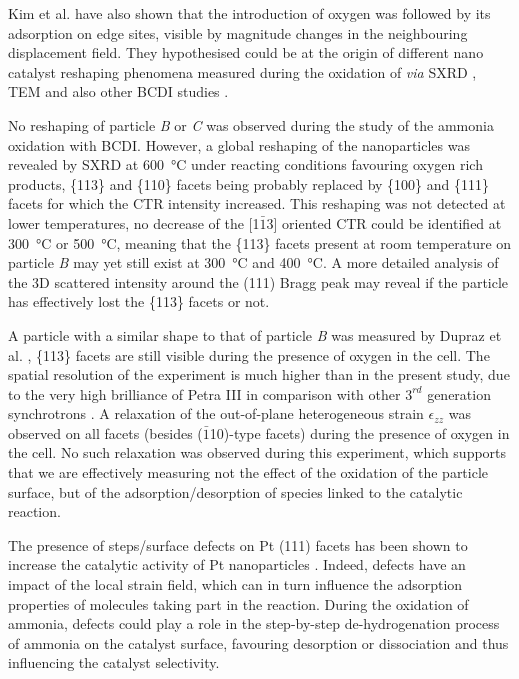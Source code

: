 Kim et al. \parencite*{Kim2018} have also shown that the introduction of oxygen was followed by its adsorption on edge sites, visible by magnitude changes in the neighbouring displacement field.
They hypothesised could be at the origin of different nano catalyst reshaping phenomena measured during the oxidation of  \textit{via} SXRD \parencite{Nolte2008, Hejral2016}, TEM \parencite{Vendelbo2014} and also other BCDI studies \parencite{Abuin2019}.

No reshaping of particle \textit{B} or \textit{C} was observed during the study of the ammonia oxidation with BCDI.
However, a global reshaping of the nanoparticles was revealed by SXRD at \qty{600}{\degreeCelsius} under reacting conditions favouring oxygen rich products, \{113\} and \{110\} facets being probably replaced by \{100\} and \{111\} facets for which the CTR intensity increased.
This reshaping was not detected at lower temperatures, no decrease of the [1$\bar{1}$3] oriented CTR could be identified at \qty{300}{\degreeCelsius} or \qty{500}{\degreeCelsius}, meaning that the \{113\} facets present at room temperature on particle \textit{B} may yet still exist at \qty{300}{\degreeCelsius} and \qty{400}{\degreeCelsius}.
A more detailed analysis of the 3D scattered intensity around the (111) Bragg peak may reveal if the particle has effectively lost the \{113\} facets or not.

A particle with a similar shape to that of particle \textit{B} was measured by Dupraz et al. \parencite*{Dupraz2022}, \{113\} facets are still visible during the presence of oxygen in the cell.
The spatial resolution of the experiment is much higher than in the present study, due to the very high brilliance of Petra III in comparison with other $3^{rd}$ generation synchrotrons \parencite{Bilderback2005}.
A relaxation of the out-of-plane heterogeneous strain $\epsilon_{zz}$ was observed on all facets (besides ($\bar{1}$10)-type facets) during the presence of oxygen in the cell.
No such relaxation was observed during this experiment, which supports that we are effectively measuring not the effect of the oxidation of the particle surface, but of the adsorption/desorption of species linked to the catalytic reaction.

The presence of steps/surface defects on Pt (111) facets has been shown to increase the catalytic activity of Pt nanoparticles \parencite{Segner1984, Chen2012}.
Indeed, defects have an impact of the local strain field, which can in turn influence the adsorption properties of molecules taking part in the reaction.
During the oxidation of ammonia, defects could play a role in the step-by-step de-hydrogenation process of ammonia on the catalyst surface, favouring  desorption or dissociation and thus influencing the catalyst selectivity.


